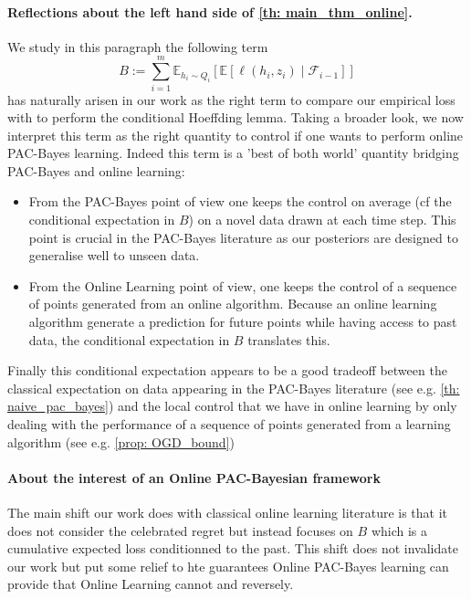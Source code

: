  \paragraph{Reflections about the left hand side of \cref{th: main_thm_online}.}

 We study in this paragraph the following term
  $$B:=\sum_{i=1}^m \mathbb{E}_{h_i\sim Q_{i}}\left[ \mathbb{E}[\ell(h_i,z_i) \mid \mathcal{F}_{i-1}]    \right]$$ has naturally arisen in our work as the right term to compare our empirical loss with to perform the conditional Hoeffding lemma.
 Taking a broader look, we now interpret this term as the right quantity to control if one wants to perform online PAC-Bayes learning. Indeed this term is a 'best of both world' quantity bridging PAC-Bayes and online learning:

 \begin{itemize}
   \item From the PAC-Bayes point of view one keeps the control on average (cf the conditional expectation in $B$) on a novel data drawn at each time step. This point is crucial in the PAC-Bayes literature as our posteriors are designed to generalise well to unseen data.
   \item From the Online Learning point of view, one keeps the control of a sequence of points generated from an online algorithm. Because an online learning algorithm generate a prediction for future points while having access to past data, the conditional expectation in $B$ translates this.
 \end{itemize}

Finally this conditional expectation appears to be a good tradeoff between the classical expectation on data appearing in the PAC-Bayes literature (see e.g. \cref{th: naive_pac_bayes}) and the local control that we have in online learning by only dealing with the performance of a sequence of points generated from a learning algorithm (see e.g. \cref{prop: OGD_bound})


\paragraph{About the interest of an Online PAC-Bayesian framework}
The main shift our work does with classical online learning literature is that it does not consider the celebrated regret but instead focuses on $B$ which is a cumulative expected loss conditionned to the past. This shift does not invalidate our work but put some relief to hte guarantees Online PAC-Bayes learning can provide that Online Learning cannot and reversely.

